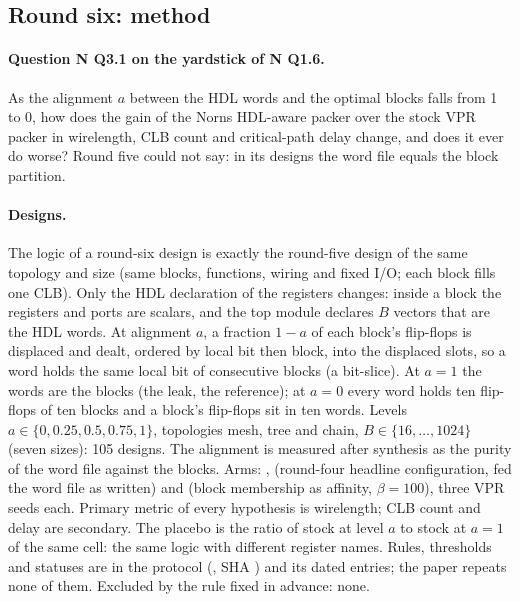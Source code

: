 
\subsection{Round six: method}
\label{sec:r6-method}
\paragraph{Question N Q3.1 on the yardstick of N Q1.6.} As the alignment $a$ between the HDL words and the optimal blocks falls from 1 to 0, how does the gain of the Norns HDL-aware packer over the stock VPR packer in wirelength, CLB count and critical-path delay change, and does it ever do worse? Round five could not say: in its  designs the word file equals the block partition.
\paragraph{Designs.} The logic of a round-six design is exactly the round-five  design of the same topology and size (same blocks, functions, wiring and fixed I/O; each block fills one CLB). Only the HDL declaration of the registers changes: inside a block the registers and ports are scalars, and the top module declares $B$ vectors  that are the HDL words. At alignment $a$, a fraction $1-a$ of each block's flip-flops is displaced and dealt, ordered by local bit then block, into the displaced slots, so a word holds the same local bit of consecutive blocks (a bit-slice). At $a=1$ the words are the blocks (the leak, the reference); at $a=0$ every word holds ten flip-flops of ten blocks and a block's flip-flops sit in ten words. Levels $a\in\{0,0.25,0.5,0.75,1\}$, topologies mesh, tree and chain, $B\in\{16,\dots,1024\}$ (seven sizes): 105 designs. The alignment is measured after synthesis as the purity of the word file against the blocks. Arms: ,  (round-four headline configuration, fed the word file as written) and  (block membership as affinity, $\beta=100$), three VPR seeds each. Primary metric of every hypothesis is wirelength; CLB count and delay are secondary. The placebo is the ratio of stock at level $a$ to stock at $a=1$ of the same cell: the same logic with different register names.
Rules, thresholds and statuses are in the protocol (, SHA ) and its dated entries; the paper repeats none of them. Excluded by the rule fixed in advance: none.
